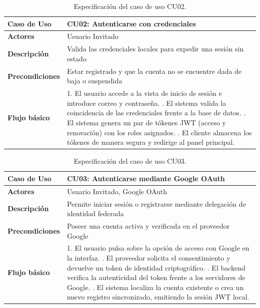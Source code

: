 \begin{table}[H]
\centering
\begin{tabular}{|p{3.1cm}|p{10.9cm}|}
\hline
\textbf{Caso de Uso} & \textbf{CU02: Autenticarse con credenciales} \\ \hline
\textbf{Actores} & Usuario Invitado \\ \hline
\textbf{Descripción} & Valida las credenciales locales para expedir una sesión sin estado \\ \hline
\textbf{Precondiciones} & Estar registrado y que la cuenta no se encuentre dada de baja o suspendida \\ \hline
\textbf{Flujo básico} & 
1. El usuario accede a la vista de inicio de sesión e introduce correo y contraseña. \newline
2. El sistema valida la coincidencia de las credenciales frente a la base de datos. \newline
3. El sistema genera un par de tókenes JWT (acceso y renovación) con los roles asignados. \newline
4. El cliente almacena los tókenes de manera segura y redirige al panel principal. \\ \hline
\end{tabular}
\caption{Especificación del caso de uso CU02.}
\label{tab:cu02}
\end{table}

\begin{table}[H]
\centering
\begin{tabular}{|p{3.1cm}|p{10.9cm}|}
\hline
\textbf{Caso de Uso} & \textbf{CU03: Autenticarse mediante Google OAuth} \\ \hline
\textbf{Actores} & Usuario Invitado, Google OAuth \\ \hline
\textbf{Descripción} & Permite iniciar sesión o registrarse mediante delegación de identidad federada \\ \hline
\textbf{Precondiciones} & Poseer una cuenta activa y verificada en el proveedor Google \\ \hline
\textbf{Flujo básico} & 
1. El usuario pulsa sobre la opción de acceso con Google en la interfaz. \newline
2. El proveedor solicita el consentimiento y devuelve un token de identidad criptográfico. \newline
3. El backend verifica la autenticidad del token frente a los servidores de Google. \newline
4. El sistema localiza la cuenta existente o crea un nuevo registro sincronizado, emitiendo la sesión JWT local. \\ \hline
\end{tabular}
\caption{Especificación del caso de uso CU03.}
\label{tab:cu03}
\end{table}

